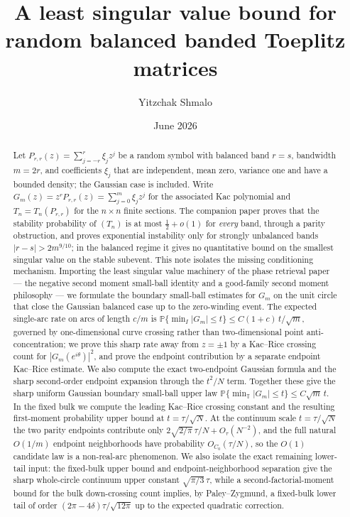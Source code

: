\documentclass[11pt]{amsart}
\title[A condition-number bound for balanced banded Toeplitz matrices]{A least singular value bound for random balanced banded Toeplitz matrices}
\author{Yitzchak Shmalo}
\date{June 2026}
\numberwithin{equation}{section}
\theoremstyle{definition}
\theoremstyle{remark}
\newcommand{\T}{\mathbb T}
\newcommand{\Prob}{\mathbb P}
\newcommand{\abs}[1]{\left\lvert #1\right\rvert}
\begin{document}
\begin{abstract}
Let $P_{r,r}(z)=\sum_{j=-r}^{r}\xi_jz^{j}$ be a random symbol with
balanced band $r=s$, bandwidth $m=2r$, and coefficients $\xi_j$ that are
independent, mean zero, variance one and have a bounded density; the Gaussian
case is included. Write $G_m(z)=z^rP_{r,r}(z)=\sum_{j=0}^m\xi_jz^j$ for the
associated Kac polynomial and $T_n=T_n(P_{r,r})$ for the $n\times n$ finite
sections. The companion paper \cite{Parity} proves that the stability
probability of $(T_n)$ is at most $\tfrac12+o(1)$ for \emph{every} band,
through a parity obstruction, and proves exponential instability only for
strongly unbalanced bands $\abs{r-s}>2m^{9/10}$; in the balanced regime it
gives no quantitative bound on the smallest singular value on the stable
subevent. This note isolates the missing conditioning mechanism. Importing the
least singular value machinery of the phase retrieval paper \cite{PhaseRetrieval}
--- the negative second moment small-ball identity and a good-family second
moment philosophy --- we formulate the boundary small-ball estimates for $G_m$
on the unit circle that close the Gaussian balanced case up to the zero-winding
event. The expected single-arc rate on arcs of length $c/m$ is
$\Prob\{\min_I\abs{G_m}\le t\}\le C(1+c)\,t/\sqrt m$, governed by
one-dimensional curve crossing rather than two-dimensional point
anti-concentration; we prove this sharp rate away from $z=\pm1$ by a Kac--Rice
crossing count for \(|G_m(e^{i\theta})|^2\), and prove the endpoint contribution
by a separate endpoint Kac--Rice estimate. We also compute the exact
two-endpoint Gaussian formula and the sharp second-order endpoint expansion
through the \(t^2/N\) term. Together these give the sharp uniform
Gaussian boundary small-ball upper law
\(\Prob\{\min_{\T}\abs{G_m}\le t\}\le C\sqrt m\,t\). In the fixed bulk we
compute the leading Kac--Rice crossing constant and the resulting first-moment
probability upper bound at \(t=\tau/\sqrt N\). At the continuum scale
\(t=\tau/\sqrt N\) the two parity endpoints contribute only
\(2\sqrt{2/\pi}\,\tau/N+O_\tau(N^{-2})\), and the full natural
\(O(1/m)\) endpoint neighborhoods have probability \(O_{C_0}(\tau/N)\), so the
\(O(1)\) candidate law is a non-real-arc phenomenon. We also isolate the exact
remaining lower-tail input: the fixed-bulk upper bound and endpoint-neighborhood
separation give the sharp whole-circle continuum upper constant
\(\sqrt{\pi/3}\,\tau\), while a second-factorial-moment bound for the bulk
down-crossing count implies, by Paley--Zygmund, a fixed-bulk lower tail of order
\((2\pi-4\delta)\tau/\sqrt{12\pi}\) up to the expected quadratic correction.

\end{abstract}
\end{document}
